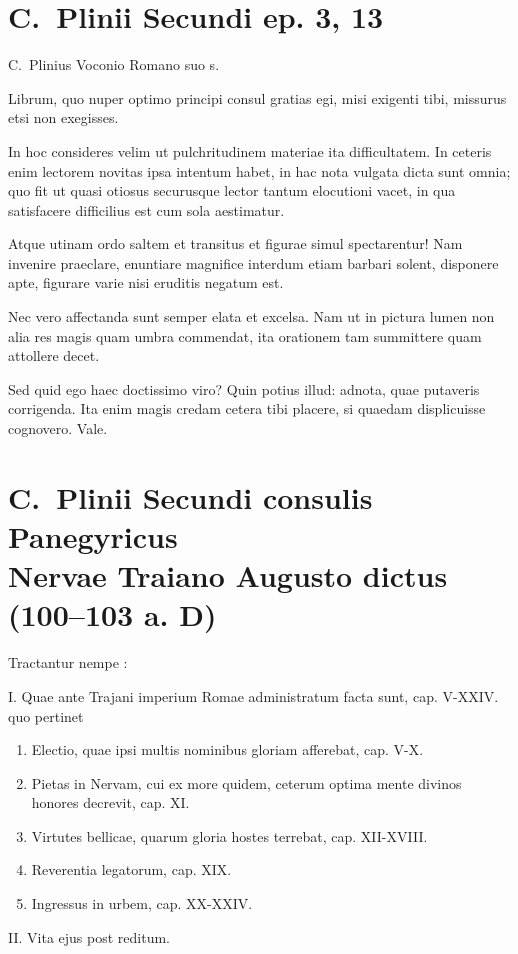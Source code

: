 
\section*{C.\ Plinii Secundi ep. 3, 13}

C.~Plinius Voconio Romano suo s.

Librum, quo nuper optimo principi consul gratias egi, misi exigenti tibi, missurus etsi non exegisses.

In hoc consideres velim ut pulchritudinem materiae ita difficultatem. In ceteris enim lectorem novitas ipsa intentum habet, in hac nota vulgata dicta sunt omnia; quo fit ut quasi otiosus securusque lector tantum elocutioni vacet, in qua satisfacere difficilius est cum sola aestimatur.

Atque utinam ordo saltem et transitus et figurae simul spectarentur! Nam invenire praeclare, enuntiare magnifice interdum etiam barbari solent, disponere apte, figurare varie nisi eruditis negatum est.

Nec vero affectanda sunt semper elata et excelsa. Nam ut in pictura lumen non alia res magis quam umbra commendat, ita orationem tam summittere quam attollere decet.

Sed quid ego haec doctissimo viro? Quin potius illud: adnota, quae putaveris corrigenda. Ita enim magis credam cetera tibi placere, si quaedam displicuisse cognovero. Vale.



\section*{C.\ Plinii Secundi consulis Panegyricus \\Nervae Traiano Augusto dictus (100–103 a. D)}

Tractantur nempe :

I. Quae ante Trajani imperium Romae administratum facta sunt, cap. V-XXIV. quo pertinet
\begin{enumerate}
\item Electio, quae ipsi multis nominibus gloriam afferebat, cap. V-X.
\item Pietas in Nervam, cui ex more quidem, ceterum optima mente divinos honores decrevit, cap. XI.
\item Virtutes bellicae, quarum gloria hostes terrebat, cap. XII-XVIII.
\item Reverentia legatorum, cap. XIX.
\item Ingressus in urbem, cap. XX-XXIV.
\end{enumerate}
II. Vita ejus post reditum.

